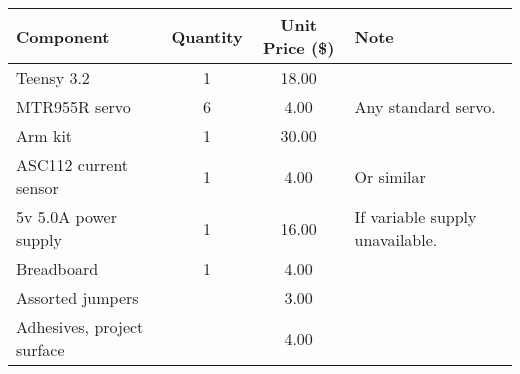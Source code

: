 \documentclass{article}
\begin{document}
\begin{center}
	\begin{tabular}{ l c c  p{5cm} }
		\toprule
		Component & Quantity & Unit Price (\$) & Note \\ \midrule
		Teensy 3.2 & 1 & 18.00 &  \\ 
		MTR955R servo & 6 & 4.00 & Any standard servo.\\ 
		Arm kit & 1 & 30.00 & \\
		ASC112 current sensor & 1 & 4.00 & Or similar\\
		5v 5.0A power supply & 1 & 16.00 & If variable supply unavailable. \\ 
		Breadboard & 1 & 4.00 & \\
		Assorted jumpers & & 3.00 & \\
		Adhesives, project surface & & 4.00 & \\
		\bottomrule
		
	\end{tabular}
\end{center}

	
\end{document}
